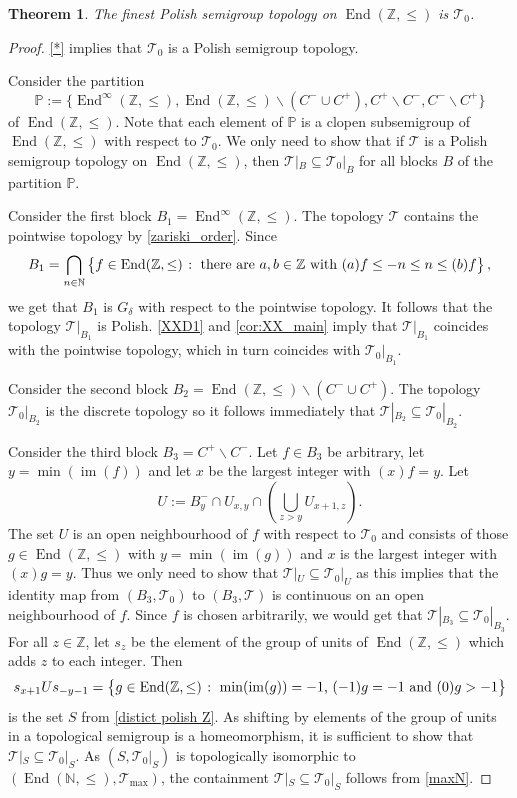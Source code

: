 \documentclass[11pt]{amsart}
\makeatletter
\newtheorem{theorem}{Theorem}[section]
\theoremstyle{definition}
\newcommand{\N}{\mathbb N}
\newcommand{\Tau}{\mathcal T}
\newcommand{\Zendd}{\operatorname{End}(\mathbb Z, \leq)}
\newcommand{\Endd}{\operatorname{End}(\mathbb N, \leq)}
\newcommand{\Z}{\mathbb Z}
\newcommand{\im}{\operatorname{im}}
\newcommand{\makeset}[2]{\left\lbrace #1 \; \colon\;
 \begin{tabular}{@{}l@{}}
   #2
  \end{tabular}
  \right\rbrace}
\makeatother
\begin{document}
\begin{theorem}\label{maxZ}
The finest Polish semigroup topology on $\Zendd$ is $\Tau_0$. 
\end{theorem}
\begin{proof}
    \cref{*} implies that \(\Tau_0\) is a Polish semigroup topology.

    Consider the partition 
    \[\mathbb P:=\{\operatorname{End}^\infty(\Z,\leq), \Zendd\backslash (C^-\cup C^+), C^+\backslash C^-,C^-\backslash C^+\}\] of \(\operatorname{End}(\Z,\leq)\).
    Note that each element of \(\mathbb P\) is a clopen subsemigroup of \(\operatorname{End}(\Z,\leq)\) with respect to \(\Tau_0\). We only need to show that if \(\Tau\) is a Polish semigroup topology on \(\operatorname{End}(\Z,\leq)\), then \(\Tau|_B\subseteq \Tau_0|_B\) for all blocks \(B\) of the partition \(\mathbb P\). 

    Consider the first block \(B_1=\operatorname{End}^\infty(\Z,\leq)\). The topology \(\Tau\) contains the pointwise topology by \cref{zariski_order}. Since 
    \[B_1=\bigcap_{n\in \N}\makeset{f\in \Zendd}{there are \(a,b\in \Z\) with \((a)f\leq -n\leq n\leq (b)f\)},\]
    we get that $B_1$ is \(G_\delta\) with respect to the pointwise topology. It follows that the topology \(\Tau|_{B_1}\) is Polish. \cref{XXD1} and \cref{cor:XX_main} imply that \(\Tau|_{B_1}\) coincides with the pointwise topology, which in turn coincides with \(\Tau_0|_{B_1}\).

    Consider the second block \(B_2=\Zendd\backslash (C^-\cup C^+)\). The topology \(\Tau_0|_{B_2}\) is the discrete topology so it follows immediately that \(\Tau|_{B_2}\subseteq \Tau_0|_{B_2}\).

    Consider the third block \(B_3=C^+\backslash C^-\). Let \(f\in B_3\) be arbitrary, let \(y=\min(\im(f))\) and let \(x\) be the largest integer with \((x)f=y\).
    Let 
    \[U:=B_{y}^-\cap U_{x,y}\cap (\bigcup_{z>y} U_{x+1,z}).\]
    The set \(U\) is an open neighbourhood of \(f\) with respect to \(\Tau_0\) and consists of those \(g\in \Zendd\) with \(y=\min(\im(g))\) and \(x\) is the largest integer with \((x)g=y\). 
    Thus we only need to show that \(\Tau|_U\subseteq \Tau_0|_U\) as this implies that the identity map from \((B_3,\Tau_0)\) to \((B_3,\Tau)\) is continuous on an open neighbourhood of \(f\). Since $f$ is chosen arbitrarily, we would get that $\Tau|_{B_3}\subseteq \Tau_0|_{B_3}$. For all \(z\in \Z\), let \(s_z\) be the element of the group of units of \(\operatorname{End}(\Z,\leq)\) which adds \(z\) to each integer.
    Then 
    \[s_{x+1}Us_{-y-1}=\makeset{g\in \Zendd}{\(\min(\im(g))=-1\), \((-1)g=-1\) and \((0)g >-1\)}\]
    is the set \(S\) from \cref{distict polish Z}. 
    As shifting by elements of the group of units in a topological semigroup is a homeomorphism, it is sufficient to show that \(\Tau|_S\subseteq \Tau_0|_S\). As \((S,\Tau_0|_S)\) is topologically isomorphic to \((\Endd,\Tau_{\max})\), the containment  \(\Tau|_S\subseteq \Tau_0|_S\) follows from \cref{maxN}.


\end{proof}
\end{document}
